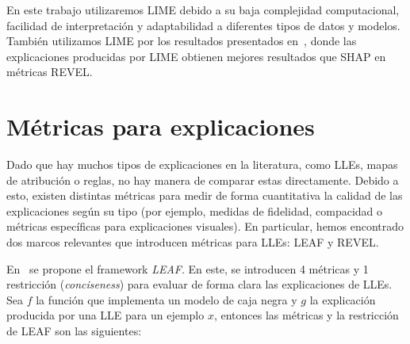 En este trabajo utilizaremos LIME debido a su baja complejidad computacional, facilidad de interpretación y adaptabilidad a diferentes tipos de datos y modelos. También utilizamos LIME por los resultados presentados en~\cite{REVEL}, donde las explicaciones producidas por LIME obtienen mejores resultados que SHAP en métricas REVEL.

\section{Métricas para explicaciones}

Dado que hay muchos tipos de explicaciones en la literatura, como LLEs, mapas de atribución o reglas, no hay manera de comparar estas directamente. Debido a esto, existen distintas métricas para medir de forma cuantitativa la calidad de las explicaciones según su tipo (por ejemplo, medidas de fidelidad, compacidad o métricas específicas para explicaciones visuales). En particular, hemos encontrado dos marcos relevantes que introducen métricas para LLEs: LEAF y REVEL.

En~\cite{LEAF} se propone el framework \textit{LEAF}. En este, se introducen 4 métricas y 1 restricción (\textit{conciseness}) para evaluar de forma clara las explicaciones de LLEs. Sea $f$ la función que implementa un modelo de caja negra y $g$ la explicación producida por una LLE para un ejemplo $x$, entonces las métricas y la restricción de LEAF son las siguientes:

